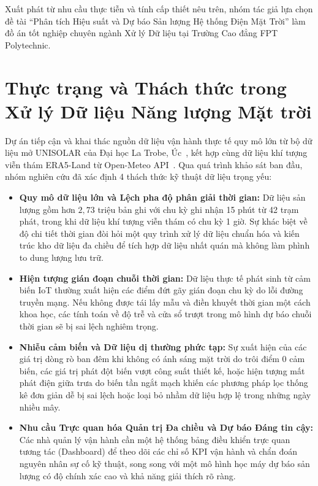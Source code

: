 \documentclass[12pt, a4paper]{report}
\begin{document}
Xuất phát từ nhu cầu thực tiễn và tính cấp thiết nêu trên, nhóm tác giả lựa chọn đề tài ``Phân tích Hiệu suất và Dự báo Sản lượng Hệ thống Điện Mặt Trời'' làm đồ án tốt nghiệp chuyên ngành Xử lý Dữ liệu tại Trường Cao đẳng FPT Polytechnic.

\section{Thực trạng và Thách thức trong Xử lý Dữ liệu Năng lượng Mặt trời}
\label{sec:thuctrang_thachthuc}

Dự án tiếp cận và khai thác nguồn dữ liệu vận hành thực tế quy mô lớn từ bộ dữ liệu mở UNISOLAR của Đại học La Trobe, Úc~\cite{wimalaratne2022unisolar}, kết hợp cùng dữ liệu khí tượng viễn thám ERA5-Land từ Open-Meteo API~\cite{openmeteo2023}. Qua quá trình khảo sát ban đầu, nhóm nghiên cứu đã xác định 4 thách thức kỹ thuật dữ liệu trọng yếu:

\begin{itemize}[noitemsep]
    \item \textbf{Quy mô dữ liệu lớn và Lệch pha độ phân giải thời gian:} Dữ liệu sản lượng gồm hơn $2{,}73$ triệu bản ghi với chu kỳ ghi nhận 15 phút từ 42 trạm phát, trong khi dữ liệu khí tượng viễn thám có chu kỳ 1 giờ. Sự khác biệt về độ chi tiết thời gian đòi hỏi một quy trình xử lý dữ liệu chuẩn hóa và kiến trúc kho dữ liệu đa chiều để tích hợp dữ liệu nhất quán mà không làm phình to dung lượng lưu trữ.
    \item \textbf{Hiện tượng gián đoạn chuỗi thời gian:} Dữ liệu thực tế phát sinh từ cảm biến IoT thường xuất hiện các điểm đứt gãy gián đoạn chu kỳ do lỗi đường truyền mạng. Nếu không được tái lấy mẫu và điền khuyết thời gian một cách khoa học, các tính toán về độ trễ và cửa sổ trượt trong mô hình dự báo chuỗi thời gian sẽ bị sai lệch nghiêm trọng.
    \item \textbf{Nhiễu cảm biến và Dữ liệu dị thường phức tạp:} Sự xuất hiện của các giá trị dòng rò ban đêm khi không có ánh sáng mặt trời do trôi điểm 0 cảm biến, các giá trị phát đột biến vượt công suất thiết kế, hoặc hiện tượng mất phát điện giữa trưa do biến tần ngắt mạch khiến các phương pháp lọc thống kê đơn giản dễ bị sai lệch hoặc loại bỏ nhầm dữ liệu hợp lệ trong những ngày nhiều mây.
    \item \textbf{Nhu cầu Trực quan hóa Quản trị Đa chiều và Dự báo Đáng tin cậy:} Các nhà quản lý vận hành cần một hệ thống bảng điều khiển trực quan tương tác (Dashboard) để theo dõi các chỉ số KPI vận hành và chẩn đoán nguyên nhân sự cố kỹ thuật, song song với một mô hình học máy dự báo sản lượng có độ chính xác cao và khả năng giải thích rõ ràng.
\end{itemize}
\end{document}
